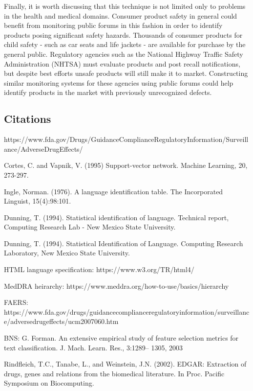 \documentclass[twoside,11pt]{article}
\begin{document}
Finally, it is worth discussing that this technique is not limited only to problems in the health and medical domains. Consumer product safety in general could benefit from monitoring public forums in this fashion in order to identify products posing significant safety hazards. Thousands of consumer products for child safety - such as car seats and life jackets - are available for purchase by the general public. Regulatory agencies such as the National Highway Traffic Safety Administration (NHTSA) must evaluate products and post recall notifications, but despite best efforts unsafe products will still make it to market. Constructing similar monitoring systems for these agencies using public forums could help identify products in the market with previously unrecognized defects.

\newpage




\subsection{Citations}
https://www.fda.gov/Drugs/GuidanceComplianceRegulatoryInformation/Surveillance/AdverseDrugEffects/


Cortes, C. and Vapnik, V. (1995) Support-vector network. Machine Learning, 20, 273-297.




Ingle, Norman. (1976). A language identification table.
The Incorporated Linguist, 15(4):98:101.

Dunning, T. (1994). Statistical identification of language. Technical report, Computing
Research Lab - New Mexico State University.


Dunning, T. (1994). Statistical Identification of Language. Computing Research Laboratory,
New Mexico State University.

HTML language specification: https://www.w3.org/TR/html4/

MedDRA heirarchy:  https://www.meddra.org/how-to-use/basics/hierarchy

FAERS: https://www.fda.gov/drugs/guidancecomplianceregulatoryinformation/surveillance/adversedrugeffects/ucm2007060.htm

BNS:
G. Forman. An extensive empirical study of feature selection
metrics for text classification. J. Mach. Learn. Res., 3:1289–
1305, 2003


Rindfleich, T.C., Tanabe, L., and Weinstein, J.N. (2002). EDGAR: Extraction of drugs, genes and relations from the biomedical literature.  In Proc. Pacific Symposium on Biocomputing.
\end{document}

